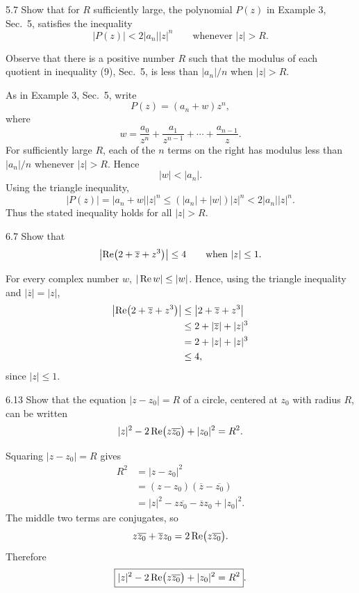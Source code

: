 \documentclass[11pt,oneside]{article}
\begin{document}
\begin{exercise}{5.7}
Show that for \(R\) sufficiently large, the polynomial \(P(z)\) in Example 3, Sec.~5, satisfies the inequality
\[
    |P(z)|<2|a_n||z|^n
    \qquad\text{whenever }|z|>R.
\]
\begin{suggestion}
Observe that there is a positive number \(R\) such that the modulus of each quotient in inequality (9), Sec.~5, is less than \(|a_n|/n\) when \(|z|>R\).
\end{suggestion}
\end{exercise}

\begin{solution}
As in Example 3, Sec.~5, write
\[
    P(z)=(a_n+w)z^n,
\]
where
\[
    w=\frac{a_0}{z^n}+\frac{a_1}{z^{n-1}}+\cdots+\frac{a_{n-1}}{z}.
\]
For sufficiently large \(R\), each of the \(n\) terms on the right has modulus less than \(|a_n|/n\) whenever \(|z|>R\). Hence
\[
    |w|<|a_n|.
\]
Using the triangle inequality,
\[
    |P(z)|=|a_n+w||z|^n
    \le (|a_n|+|w|)|z|^n
    <2|a_n||z|^n.
\]
Thus the stated inequality holds for all \(|z|>R\).
\end{solution}

\begin{exercise}{6.7}
Show that
\[
    \left|\operatorname{Re}\bigl(2+\overline z+z^3\bigr)\right|\le4
    \qquad\text{when }|z|\le1.
\]
\end{exercise}

\begin{solution}
For every complex number \(w\), \(|\operatorname{Re} w|\le |w|\). Hence, using the triangle inequality and \(|\overline z|=|z|\),
\[
\begin{aligned}
    \left|\operatorname{Re}\bigl(2+\overline z+z^3\bigr)\right|
    &\le \left|2+\overline z+z^3\right|\\
    &\le 2+|\overline z|+|z|^3\\
    &=2+|z|+|z|^3\\
    &\le4,
\end{aligned}
\]
since \(|z|\le1\).
\end{solution}

\begin{exercise}{6.13}
Show that the equation \(|z-z_0|=R\) of a circle, centered at \(z_0\) with radius \(R\), can be written
\[
    |z|^2-2\operatorname{Re}\bigl(z\overline{z_0}\bigr)+|z_0|^2=R^2.
\]
\end{exercise}

\begin{solution}
Squaring \(|z-z_0|=R\) gives
\[
\begin{aligned}
    R^2
    &=|z-z_0|^2\\
    &=(z-z_0)(\overline z-\overline{z_0})\\
    &=|z|^2-z\overline{z_0}-\overline z z_0+|z_0|^2.
\end{aligned}
\]
The middle two terms are conjugates, so
\[
    z\overline{z_0}+\overline z z_0
    =2\operatorname{Re}\bigl(z\overline{z_0}\bigr).
\]
Therefore
\[
    \boxed{|z|^2-2\operatorname{Re}\bigl(z\overline{z_0}\bigr)+|z_0|^2=R^2}.
\]
\end{solution}
\end{document}
